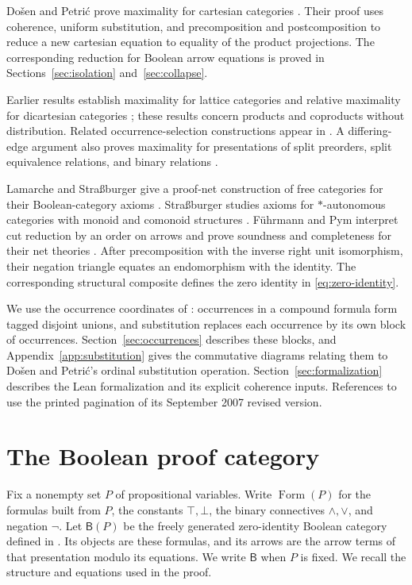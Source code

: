 \documentclass[11pt]{article}
\newcommand{\B}{\mathsf B}
\newcommand{\FormulaSet}{\operatorname{Form}}
\begin{document}
Do\v{s}en and Petri\'c prove maximality for cartesian categories
\cite[\S5]{DPCartesian}. Their proof uses coherence, uniform
substitution, and precomposition and postcomposition to reduce a new
cartesian equation to equality of the product projections. The
corresponding reduction for Boolean arrow equations is proved in
Sections~\ref{sec:isolation} and~\ref{sec:collapse}.

Earlier results establish maximality for lattice categories and relative
maximality for dicartesian categories
\cite[\S\S8--10]{DPBicartesian}; these results concern products and
coproducts without distribution. Related occurrence-selection
constructions appear in \cite[Lemma~6]{DPIsomorphic}. A differing-edge
argument also proves maximality for presentations of split preorders,
split equivalence relations, and binary relations \cite[\S16]{DPSplit}.

Lamarche and Stra{\ss}burger give a proof-net construction of free
categories for their Boolean-category axioms
\cite[Theorem~3.5.4]{LSFree}.
Stra{\ss}burger studies axioms for $*$-autonomous categories with
monoid and comonoid structures \cite{Strassburger}.
F\"uhrmann and Pym interpret cut reduction by an order on arrows and
prove soundness and completeness for their net theories
\cite[Theorems~6.4--6.5]{FP}.
After precomposition with the inverse right unit isomorphism, their
negation triangle \cite[(11), p.~28]{FP} equates an endomorphism with
the identity. The corresponding structural composite defines the
zero identity in \eqref{eq:zero-identity}.

We use the occurrence coordinates of \cite[\S9]{Notation}: occurrences
in a compound formula form tagged disjoint unions, and substitution
replaces each occurrence by its own block of occurrences.
Section~\ref{sec:occurrences} describes these blocks, and
Appendix~\ref{app:substitution} gives the commutative diagrams relating
them to Do\v{s}en and Petri\'c's ordinal substitution operation.
Section~\ref{sec:formalization} describes the Lean formalization and
its explicit coherence inputs. References to \cite{DP} use the printed
pagination of its September 2007 revised version.

\section{The Boolean proof category}\label{sec:category}

Fix a nonempty set $P$ of propositional variables. Write $\FormulaSet(P)$
for the formulas built from $P$, the constants $\top,\bot$, the binary
connectives $\wedge,\vee$, and negation $\neg$. Let $\B(P)$ be the
freely generated zero-identity Boolean category defined in
\cite[\S\S14.2--14.3]{DP}. Its objects are these formulas, and its
arrows are the arrow terms of that presentation modulo its equations.
We write $\B$ when $P$ is fixed. We recall the structure and equations
used in the proof.
\end{document}
